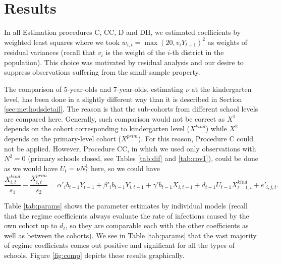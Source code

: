 \documentclass[fleqn,10pt]{wlscirep}
\begin{document}
\section{Results}
\label{sec:res}
						
In all Estimation procedures C, CC, D and DH, we estimated coefficients by weighted least squares where we took 
$
w_{i,t}=\max(20, v_i Y_{t-1})^2
$ as weights of residual variances (recall that $v_i$ is the weight of the $i$-th district in the population). This choice was motivated by residual analysis and our desire to suppress observations suffering from the small-sample property. 

The comparison of 5-year-olds and 7-year-olds, estimating $\nu$ at the kindergarten level, has been done in a slightly different way than it is described in Section  \ref{sec:methodsdetail}. The reason is that the sub-cohorts from different school levels are compared here. Generally, such comparison would not be correct as $X^1$ depends on the cohort corresponding to kindergarten level ($X^{kind}$) while $X^2$ depends on the primary-level cohort ($X^{prim}$). For this reason, Procedure C could not be applied.
However, Procedure CC, in which we used only observations with $N^2=0$ (primary schools closed, see Tables \ref{tab:dif} and \ref{tab:cov1}), could be done as we would have $U_{t}=\nu N^1_t$ here, so we could have 
$$
\frac{X^{kind}_{i,t}}{s_{1}} - \frac{X^{prim}_{i,t}}{s_{2}}
=
\alpha'_i b_{t-1} Y_{t-1} + \beta'_i b_{t-1} Y_{i,t-1} 
+ \gamma' b_{t-1} X_{i,t-1}  + d_{t-1}U_{t-1} X^{kind}_{t-1,i} + e'_{i,j,t}.$$

Table \ref{tab:params} shows the parameter estimates by individual models (recall that the regime coefficients always evaluate the rate of infections caused by the own cohort up to $d_t$, so they are comparable each with the other coefficients as well as between the cohorts). We see in Table \ref{tab:params} that the vast majority of regime coefficients comes out positive and significant for all the types of schools. Figure \ref{fig:comp} depicts these results graphically.
\end{document}
